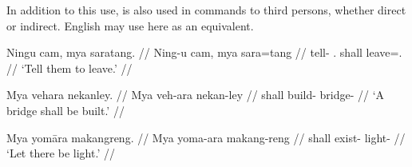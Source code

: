 In addition to this use,  is also used in commands to third 
persons, whether direct or indirect. English may use  here as an 
equivalent.

\pex
\a\begingl
	\gla Ningu cam, mya saratang. //
	\glb Ning-u cam, mya sara=tang //
	\glc tell-\Imp{} \TplM{}.\Dat{} shall leave=\TplM{}.\Aarg{} //
	\glft `Tell them to leave.' //
\endgl

\a\begingl
	\gla Mya vehara nekanley. //
	\glb Mya veh-ara nekan-ley //
	\glc shall build-\TsgI{} bridge-\PargI{} //
	\glft `A bridge shall be built.' //
\endgl

\a\begingl
	\gla Mya yomāra makangreng. //
	\glb Mya yoma-ara makang-reng //
	\glc shall exist-\TsgI{} light-\AargI{} //
	\glft `Let there be light.' //
\endgl
\xe

% 
% 
% 
% 
% 
% 
% 
% 
% 
% 
% 
% 

